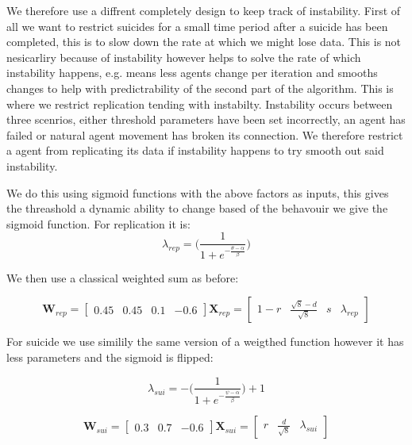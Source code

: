 \documentclass{UoYCSproject}
\begin{document}
We therefore use a diffrent completely design to keep track of instability.
First of all we want to restrict suicides for a small time period after a suicide has been completed, this is to slow down the rate at which we might lose data.
This is not nesicarliry because of instability however helps to solve the rate of which instability happens, e.g. means less agents change per iteration and smooths changes to help with predictrability of the second part of the algorithm.
This is where we restrict replication tending with instabilty.
Instability occurs between three scenrios, either threshold parameters have been set incorrectly, an agent has failed or natural agent movement has broken its connection.
We therefore restrict a agent from replicating its data if instability happens to try smooth out said instability.

We do this using sigmoid functions with the above factors as inputs, this gives the threashold a dynamic ability to change based of the behavouir we give the sigmoid function.
For replication it is:
\begin{equation}
\label{eq:1}
\lambda_{rep}  = \big( \frac{1}{1+ e^{- \frac{ \theta -  \alpha }{ \beta } } } \big)
\end{equation}

We then use a classical weighted sum as before:

\begin{equation}
\textbf{W}_{rep}  = \begin{bmatrix}0.45 & 0.45 & 0.1 & -0.6 \end{bmatrix}
\textbf{X}_{rep}  =  \begin{bmatrix} 1-r & \frac{\sqrt{8}-d}{\sqrt{8}} & s & \lambda_{rep}  \end{bmatrix} 
\end{equation}

For suicide we use similily the same version of a weigthed function however it has less parameters and the sigmoid is flipped:

\begin{equation}
\label{eq:2}
 \lambda_{sui}  = - \big( \frac{1}{1+ e^{- \frac{\psi -  \alpha }{ \beta } } } \big) + 1
\end{equation}

\begin{equation}
\textbf{W}_{sui}  = \begin{bmatrix}0.3 & 0.7 & -0.6 \end{bmatrix}
\textbf{X}_{sui}  =  \begin{bmatrix} r & \frac{d}{\sqrt{8}} & \lambda_{sui}  \end{bmatrix} 
\end{equation}
\end{document}
